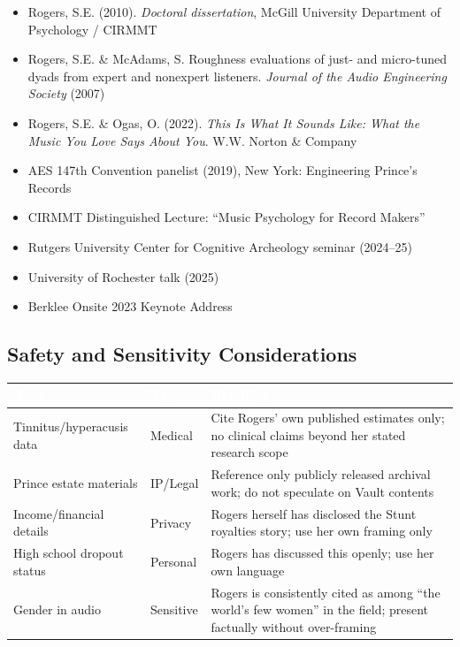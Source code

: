 \documentclass[11pt,letterpaper]{article}
\newcommand{\tableheader}[1]{\textbf{\sffamily\textcolor{white}{#1}}}
\begin{document}
\begin{itemize}[leftmargin=2em]
  \item Rogers, S.E. (2010). \textit{Doctoral dissertation}, McGill University Department of Psychology / CIRMMT
  \item Rogers, S.E. \& McAdams, S. Roughness evaluations of just- and micro-tuned dyads from expert and nonexpert listeners. \textit{Journal of the Audio Engineering Society} (2007)
  \item Rogers, S.E. \& Ogas, O. (2022). \textit{This Is What It Sounds Like: What the Music You Love Says About You}. W.W. Norton \& Company
  \item AES 147th Convention panelist (2019), New York: Engineering Prince's Records
  \item CIRMMT Distinguished Lecture: ``Music Psychology for Record Makers''
  \item Rutgers University Center for Cognitive Archeology seminar (2024--25)
  \item University of Rochester talk (2025)
  \item Berklee Onsite 2023 Keynote Address
\end{itemize}

\subsection{Safety and Sensitivity Considerations}

\begin{center}
\begin{tabularx}{\textwidth}{L{3.5cm}L{2cm}X}
\toprule
{}
\tableheader{Area} & \tableheader{Type} & \tableheader{Handling} \\
\midrule
Tinnitus/hyperacusis data & Medical & Cite Rogers' own published estimates only; no clinical claims beyond her stated research scope \\
Prince estate materials & IP/Legal & Reference only publicly released archival work; do not speculate on Vault contents \\
Income/financial details & Privacy & Rogers herself has disclosed the Stunt royalties story; use her own framing only \\
High school dropout status & Personal & Rogers has discussed this openly; use her own language \\
Gender in audio & Sensitive & Rogers is consistently cited as among ``the world's few women'' in the field; present factually without over-framing \\
\bottomrule
\end{tabularx}
\end{center}
\end{document}

